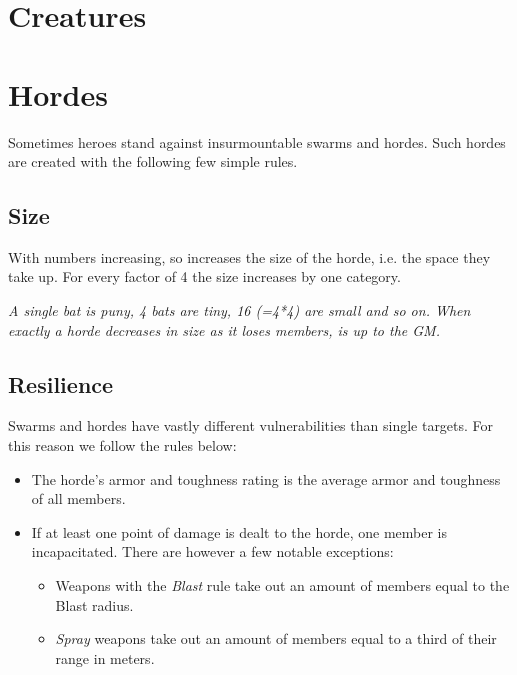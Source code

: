 \documentclass[12pt,a4paper,openany,usenames,dvipsnames]{book}
\begin{document}
	\vspace{5mm}
	

	\pagebreak

	\section{Creatures}
	

	\pagebreak
	\section{Hordes}
	Sometimes heroes stand against insurmountable swarms and hordes. Such hordes are created with the following few simple rules.
	
	\subsection*{Size}
	With numbers increasing, so increases the size of the horde, i.e. the space they take up. For every factor of 4 the size increases by one category.
	\begin{exampleblock}
		\itshape A single bat is puny, 4 bats are tiny, 16 (=4*4) are small and so on.
		When exactly a horde decreases in size as it loses members, is up to the GM.
	\end{exampleblock}
	
	\subsection*{Resilience}
	Swarms and hordes have vastly different vulnerabilities than single targets. For this reason we follow the rules below:
	\begin{itemize}
		\setlength\itemsep{-8mm} \vspace{-8mm}
		\item The horde's armor and toughness rating is the average armor and toughness of all members.
		\item If at least one point of damage is dealt to the horde, one member is incapacitated. There are however a few notable exceptions:
			\begin{itemize}
				\setlength\itemsep{-8mm} \vspace{-8mm}
				\item Weapons with the \emph{Blast} rule take out an amount of members equal to the Blast radius.
				\item \emph{Spray} weapons take out an amount of members equal to a third of their range in meters.
			\end{itemize}
	\end{itemize}
	
\end{document}
